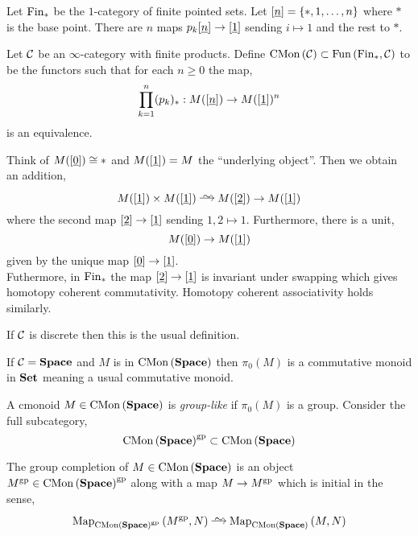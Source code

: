 \documentclass[12pt]{article}
\begin{document}
\begin{defn}
Let $\mathrm{Fin}_*$ be the $1$-category of finite pointed sets. Let $[\underline{n}] = \{ *, 1, \dots, n \}$ where $*$ is the base point. There are $n$ maps $p_k [\underline{n}] \to [\underline{1}]$ sending $i \mapsto 1$ and the rest to $*$.
\end{defn}

\begin{defn}
Let $\mathcal{C}$ be an $\infty$-category with finite products. Define $\mathrm{CMon}\left( \mathcal{C} \right) \subset \mathrm{Fun}\left( \mathrm{Fin}_*, \mathcal{C} \right)$ to be the functors such that for each $n \ge 0$ the map,
\[  \prod_{k = 1}^n (p_k)_* : M([\underline{n}]) \to M([\underline{1}])^n \] 
is an equivalence.
\end{defn}

\begin{rmk}
Think of $M([\underline{0}]) \cong *$ and $M([\underline{1}]) = M$ the ``underlying object''. Then we obtain an addition,
\[ M([\ul{1}]) \times M([\ul{1}]) \iso M([\ul{2}]) \to M([\ul{1}]) \]
where the second map $[\underline{2}] \to [\underline{1}]$ sending $1,2 \mapsto 1$. Furthermore, there is a unit,
\[ M([\underline{0}]) \to M([\underline{1}]) \]
given by the unique map $[\underline{0}] \to [\underline{1}]$. 
\bigskip\\
Futhermore, in $\mathrm{Fin}_*$ the map $[\underline{2}] \to [\underline{1}]$ is invariant under swapping which gives homotopy coherent commutativity. Homotopy coherent associativity holds similarly. 
\end{rmk}

\begin{exercise}
If $\mathcal{C}$ is discrete then this is the usual definition. 
\end{exercise}

\begin{rmk}
If $\mathcal{C} = \mathbf{Space}$ and $M$ is in $\mathrm{CMon}\left( \mathbf{Space} \right)$ then $\pi_0(M)$ is a commutative monoid in $\mathbf{Set}$ meaning a usual commutative monoid. 
\end{rmk}

\begin{defn}
A cmonoid $M \in \mathrm{CMon}\left( \mathbf{Space} \right)$ is \textit{group-like} if $\pi_0(M)$ is a group. Consider the full subcategory,
\[ \mathrm{CMon}\left( \mathbf{Space} \right)^{\mathrm{gp}} \subset \mathrm{CMon}\left( \mathbf{Space} \right) \]
\end{defn}

\begin{defn}
The group completion of $M \in \mathrm{CMon}\left( \mathbf{Space} \right)$ is an object $M^{\mathrm{gp}} \in \mathrm{CMon}\left( \mathbf{Space} \right)^{\mathrm{gp}}$ along with a map $M \to M^{\mathrm{gp}}$ which is initial in the sense,
\[ \Map{\CMon{\Space}^\gp}{M^\gp}{N}  \iso \Map{\CMon{\Space}}{M}{N} \]
\end{defn}
\end{document}
